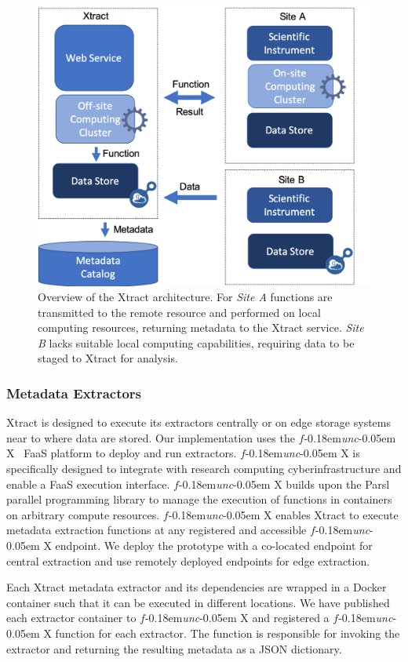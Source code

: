 \documentclass[sigconf]{acmart}
\newcommand{\name}{Xtract}
\newcommand{\funcx}{$f$\kern-0.18em\emph{unc}\kern-0.05em X}
\begin{document}
\begin{figure}[t]
	\centering
	\includegraphics[scale=0.3]{figs/new-arch.png}
	\caption{Overview of the \name{} architecture. For \textit{Site A} functions are transmitted to the remote resource and performed on local computing resources, returning metadata to the \name{} service. \textit{Site B} lacks suitable local
	computing capabilities, requiring data to be staged to \name{} for analysis.}
	\label{fig:arch}
\end{figure}

\subsubsection{Metadata Extractors}
\name{} is designed to execute its extractors centrally or on edge storage systems near to where
data are stored. 
Our implementation uses the \funcx~\cite{chard2019serverless} FaaS platform 
to deploy and run extractors. 
\funcx{} is specifically designed to integrate with research computing 
cyberinfrastructure and enable a FaaS execution interface. 
\funcx{} builds upon the Parsl~\cite{babuji2019parsl} parallel programming library to 
manage the execution of functions in containers on arbitrary compute resources. 
\funcx{} enables \name{} to execute metadata extraction functions at any registered 
and accessible \funcx{} endpoint. 
We deploy the prototype with a co-located endpoint for central extraction
and use remotely deployed endpoints for edge extraction.

Each \name{} metadata extractor and its dependencies are wrapped in a Docker container
such that it can be executed in different locations. 
We have published each extractor container to \funcx{} and registered a \funcx{} function for 
each extractor. The function is responsible for invoking the extractor and returning the 
resulting metadata as a JSON dictionary. 
\end{document}
